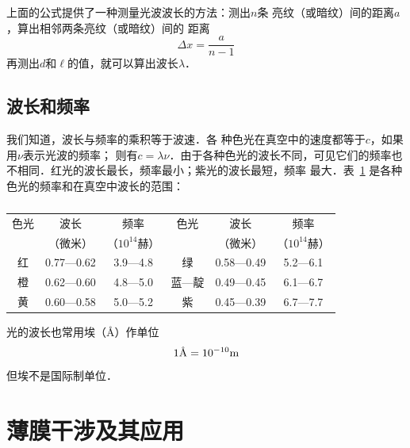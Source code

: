 上面的公式提供了一种测量光波波长的方法：测出$n$条
亮纹（或暗纹）间的距离$a$，算出相邻两条亮纹（或暗纹）间的
距离
\[\Delta x=\frac{a}{n-1} \]
再测出$d$和$\ell$的值，就可以算出波长$\lambda$．

\subsection{波长和频率}

我们知道，波长与频率的乘积等于波速．各
种色光在真空中的速度都等于$c$，如果用$\nu$表示光波的频率；
则有$c=\lambda\nu$．由于各种色光的波长不同，可见它们的频率也
不相同．红光的波长最长，频率最小；紫光的波长最短，频率
最大．表~\ref{tab_C_6-1} 是各种色光的频率和在真空中波长的范围：
\begin{table}[htbp]
	\centering
	\caption{}\label{tab_C_6-1}
    \begin{tabular}{cccccc}
        \toprule
        色光   &     波长    &    频率    &    色光    &    波长   &     频率     \\
        &（微米）&（$10^{14}$赫）&    &（微米）&（$10^{14}$赫）\\
        \midrule
        红   &  0.77—0.62   &     3.9—4.8    &    绿&0.58—0.49    &    5.2—6.1\\
        橙   & 0.62—0.60    &    4.8—5.0     &   蓝—靛    &    0.49—0.45    &    6.1—6.7\\
        黄&0.60—0.58   &     5.0—5.2     &   紫      &  0.45—0.39      &  6.7—7.7\\
        \bottomrule
    \end{tabular}
\end{table}

光的波长也常用埃（\AA）作单位
\[1\text{\AA}=10^{-10}{\rm m}\]
但埃不是国际制单位．

\section{薄膜干涉及其应用}
